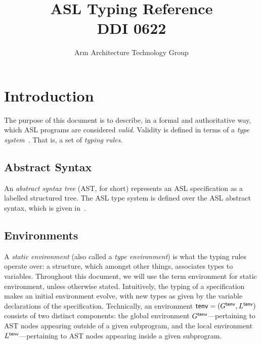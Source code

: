 \documentclass{book}
\author{Arm Architecture Technology Group}
\title{ASL Typing Reference \\
       DDI 0622}
\begin{document}
\maketitle

\tableofcontents{}





\chapter{Introduction}

The purpose of this document is to describe, in a formal and authoritative way, which ASL programs are considered \emph{valid}.
Validity is defined in terms of a \emph{type system}~\cite{TypeSystemsLucaCardelli}. That is, a set of \emph{typing rules}.

\section{Abstract Syntax}
An \emph{abstract syntax tree} (AST, for short) represents an ASL specification as a labelled structured tree.
%
The ASL type system is defined over the ASL abstract syntax, which is given in~\cite{ASLAbstractSyntaxReference}.

\section{Environments}

A \emph{static environment} (also called a \emph{type environment}) is what the typing rules operate over:
a structure, which amongst other things, associates types to variables.
Throughout this document, we will use the term environment for static environment, unless otherwise stated.
Intuitively, the typing of a
specification makes an initial environment evolve, with new types as given by the
variable declarations of the specification.
%
Technically, an environment $\textsf{tenv}=(G^{\textsf{tenv}}, L^{\textsf{tenv}})$ consists of two
distinct components: the global environment $G^{\textsf{tenv}}$---pertaining to AST nodes
appearing outside of a given subprogram, and the local environment
$L^{\textsf{tenv}}$---pertaining to AST nodes appearing inside a given subprogram.
\end{document}
